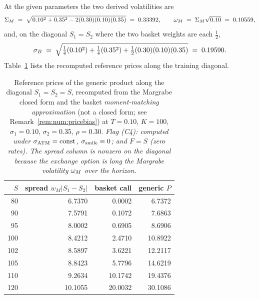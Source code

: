 At the given parameters the two derived volatilities are
\begin{equation}\label{eq:num:volsat}
   \Sigma_M \;=\; \sqrt{0.10^2 + 0.35^2 - 2(0.30)(0.10)(0.35)} \;=\; 0.33392,
   \qquad
   \omega_M \;=\; \Sigma_M\sqrt{0.10} \;=\; 0.10559,
\end{equation}
and, on the diagonal $S_1 = S_2$ where the two basket weights are each $\tfrac12$,
\[
   \sigma_B \;=\; \sqrt{\tfrac14(0.10^2) + \tfrac14(0.35^2) + \tfrac12(0.30)(0.10)(0.35)}
   \;=\; 0.19590.
\]
Table~\ref{tab:num:diag} lists the recomputed reference prices along the training
diagonal.

\begin{table}[t]
\centering
\caption{Reference prices of the generic product along the diagonal
$S_1 = S_2 = S$, recomputed from the Margrabe closed form and the basket
\emph{moment-matching approximation} (not a closed form; see
Remark~\ref{rem:num:pricebias}) at
$T = 0.10$, $K = 100$, $\sigma_1 = 0.10$, $\sigma_2 = 0.35$, $\rho = 0.30$.
\emph{Flag (C4): computed under $\sigma_{\mathrm{ATM}} = \text{const}$, $\sigma_{\mathrm{smile}} \equiv 0$; and
$F = S$ (zero rates). The spread column is nonzero on the diagonal because the
exchange option is long the Margrabe volatility $\omega_M$ over the horizon.}}
\label{tab:num:diag}
\begin{tabular}{r r r r}
\toprule
$S$ & spread $w_M|S_1-S_2|$ & basket call & generic $P$ \\
\midrule
 80 &  6.7370 &  0.0002 &  6.7372 \\
 90 &  7.5791 &  0.1072 &  7.6863 \\
 95 &  8.0002 &  0.6905 &  8.6906 \\
100 &  8.4212 &  2.4710 & 10.8922 \\
102 &  8.5897 &  3.6221 & 12.2117 \\
105 &  8.8423 &  5.7796 & 14.6219 \\
110 &  9.2634 & 10.1742 & 19.4376 \\
120 & 10.1055 & 20.0032 & 30.1086 \\
\bottomrule
\end{tabular}
\end{table}

